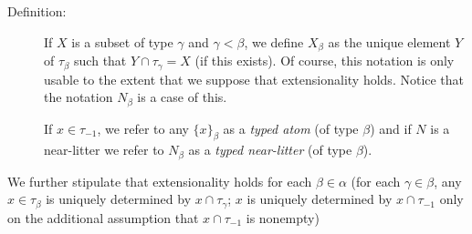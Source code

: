 \documentclass[112pt]{article}
\begin{document}
\begin{description}

\item[Definition:]  If $X$ is a subset of type $\gamma$ and $\gamma<\beta$, we define $X_\beta$ as the unique element $Y$ of $\tau_\beta$
such that $Y \cap \tau_\gamma = X$ (if this exists).  Of course, this notation is only usable to the extent that we suppose that extensionality holds.  Notice
that the notation $N_\beta$ is a case of this.

If $x \in \tau_{-1}$, we refer to any $\{x\}_\beta$ as a {\em typed atom\/} (of type $\beta$) and if $N$ is a near-litter we refer to $N_\beta$ as a {\em typed near-litter\/} (of type $\beta$).

\end{description}

We further stipulate that extensionality holds for each $\beta\in \alpha$ (for each $\gamma\in \beta$, any $x \in \tau_\beta$ is uniquely determined by $x \cap \tau_\gamma$;  $x$ is uniquely determined by $x \cap \tau_{-1}$ only on the additional assumption that $x \cap \tau_{-1}$ is nonempty)
\end{document}
